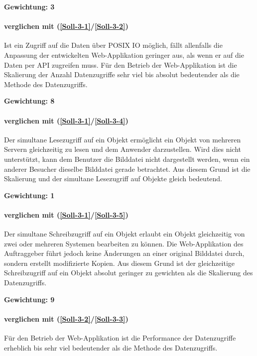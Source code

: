 \textbf{Gewichtung: 3}

\paragraph*{ verglichen mit  (\ref{Soll-3-1}/\ref{Soll-3-2})}
Ist ein Zugriff auf die Daten über POSIX IO möglich, fällt allenfalls die Anpassung der entwickelten Web-Applikation geringer aus, als wenn er auf die Daten per API zugreifen muss. Für den Betrieb der Web-Applikation ist die Skalierung der Anzahl Datenzugriffe sehr viel bis absolut bedeutender als die Methode des Datenzugriffs.

\textbf{Gewichtung: 8}


\paragraph*{ verglichen mit  (\ref{Soll-3-1}/\ref{Soll-3-4})}
Der simultane Lesezugriff auf ein Objekt ermöglicht ein Objekt von mehreren Servern gleichzeitig zu lesen und dem Anwender darzustellen. Wird dies nicht unterstützt, kann dem Benutzer die Bilddatei nicht dargestellt werden, wenn ein anderer Besucher dieselbe Bilddatei gerade betrachtet. Aus diesem Grund ist die Skalierung und der simultane Lesezugriff auf Objekte gleich bedeutend.

\textbf{Gewichtung: 1}


\paragraph*{ verglichen mit  (\ref{Soll-3-1}/\ref{Soll-3-5})}
Der simultane Schreibzugriff auf ein Objekt erlaubt ein Objekt gleichzeitig von zwei oder mehreren Systemen bearbeiten zu können. Die Web-Applikation des Auftraggeber führt jedoch keine Änderungen an einer original Bilddatei durch, sondern erstellt modifizierte Kopien. Aus diesem Grund ist der gleichzeitige Schreibzugriff auf ein Objekt absolut geringer zu gewichten als die Skalierung des Datenzugriffs.

\textbf{Gewichtung: 9}

\paragraph*{ verglichen mit  (\ref{Soll-3-2}/\ref{Soll-3-3})}
Für den Betrieb der Web-Applikation ist die Performance der Datenzugriffe erheblich bis sehr viel bedeutender als die Methode des Datenzugriffs.

